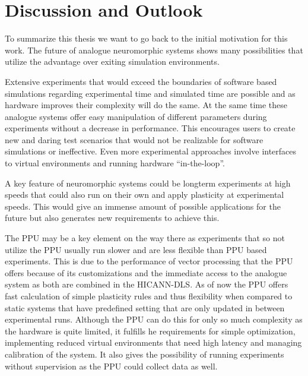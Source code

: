 \chapter{Discussion and Outlook}
\label{chapter:discussion}

To summarize this thesis we want to go back to the initial motivation for this work.
The future of analogue neuromorphic systems shows many possibilities that utilize the advantage over exiting simulation environments.

Extensive experiments that would exceed the boundaries of software based simulations regarding experimental time and simulated time are possible and as hardware improves their complexity will do the same.
At the same time these analogue systems offer easy manipulation of different parameters during experiments without a decrease in performance.
This encourages users to create new and daring test scenarios that would not be realizable for software simulations or ineffective.
Even more experimental approaches involve interfaces to virtual environments and running hardware ``in-the-loop''.

A key feature of neuromorphic systems could be longterm experiments at high speeds that could also run on their own and apply plasticity at experimental speeds.
This would give an immense amount of possible applications for the future but also generates new requirements to achieve this.

The PPU may be a key element on the way there as experiments that so not utilize the PPU usually run slower and are less flexible than PPU based experiments.
This is due to the performance of vector processing that the PPU offers because of its customizations and the immediate access to the analogue system as both are combined in the HICANN-DLS.
As of now the PPU offers fast calculation of simple plasticity rules and thus flexibility when compared to static systems that have predefined setting that are only updated in between experimental runs.
Although the PPU can do this for only so much complexity as the hardware is quite limited, it fulfills he requirements for simple optimization, implementing reduced virtual environments that need high latency and managing calibration of the system.
It also gives the possibility of running experiments without supervision as the PPU could collect data as well.

